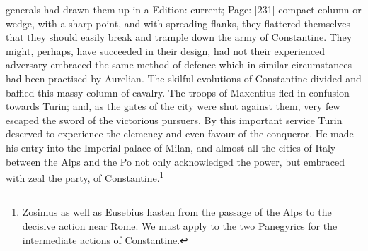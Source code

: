 generals had drawn them up in a Edition: current; Page: [231] compact column or wedge, with a sharp point, and with spreading flanks, they flattered themselves that they should easily break and trample down the army of Constantine. They might, perhaps, have succeeded in their design, had not their experienced adversary embraced the same method of defence which in similar circumstances had been practised by Aurelian. The skilful evolutions of Constantine divided and baffled this massy column of cavalry. The troops of Maxentius fled in confusion towards Turin; and, as the gates of the city were shut against them, very few escaped the sword of the victorious pursuers. By this important service Turin deserved to experience the clemency and even favour of the conqueror. He made his entry into the Imperial palace of Milan, and almost all the cities of Italy between the Alps and the Po not only acknowledged the power, but embraced with zeal the party, of Constantine.\footnote{Zosimus as well as Eusebius hasten from the passage of the Alps to the decisive action near Rome. We must apply to the two Panegyrics for the intermediate actions of Constantine.}

